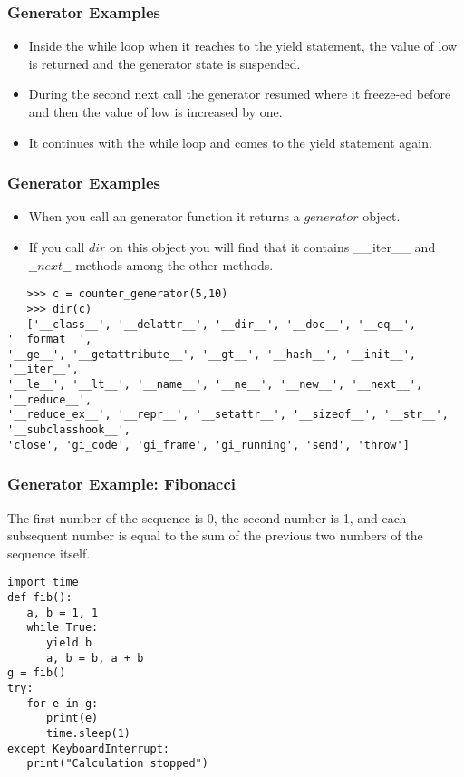 \begin{frame}[fragile]\frametitle{Generator Examples}
    \begin{itemize}
    \item  Inside the while loop when it reaches to the yield statement, the value of low is returned and the generator state is suspended. 
    \item During the second next call the generator resumed where it freeze-ed before and then the value of low is increased by one. 
    \item It continues with the while loop and comes to the yield statement again.
    \end{itemize}
\end{frame}

\begin{frame}[fragile]\frametitle{Generator Examples}
    \begin{itemize}
    \item  When you call an generator function it returns a $generator$ object.
    \item If you call $dir$ on this object you will find that it contains \_\_iter\_\_ and $\_\_next\_\_$ methods among the other methods.
    \end{itemize}
    \begin{lstlisting}
   >>> c = counter_generator(5,10)
   >>> dir(c)
   ['__class__', '__delattr__', '__dir__', '__doc__', '__eq__', '__format__',
'__ge__', '__getattribute__', '__gt__', '__hash__', '__init__', '__iter__',
'__le__', '__lt__', '__name__', '__ne__', '__new__', '__next__', '__reduce__',
'__reduce_ex__', '__repr__', '__setattr__', '__sizeof__', '__str__', '__subclasshook__',
'close', 'gi_code', 'gi_frame', 'gi_running', 'send', 'throw']
\end{lstlisting}
\end{frame}


\begin{frame}[fragile]\frametitle{Generator Example: Fibonacci }
The first number of the sequence is 0, the second number is 1, and each subsequent number is equal to the sum of the previous two numbers of the sequence itself. 
\begin{lstlisting}
import time
def fib():
   a, b = 1, 1
   while True:
      yield b
      a, b = b, a + b
g = fib()
try:
   for e in g:
      print(e)
      time.sleep(1)
except KeyboardInterrupt:
   print("Calculation stopped")
\end{lstlisting}
\end{frame}


